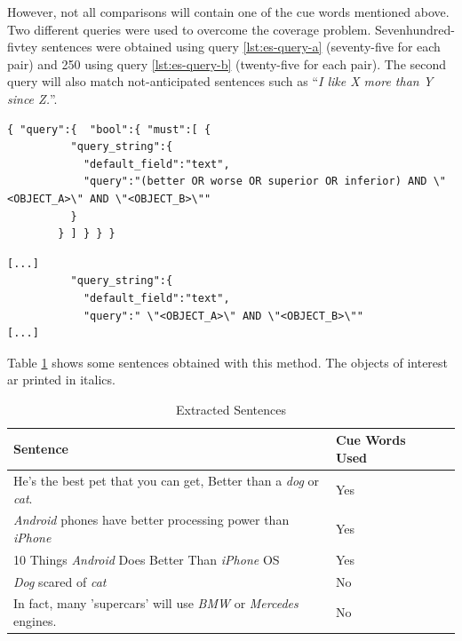 However, not all comparisons will contain one of the cue words mentioned above. Two different queries were used to overcome the coverage problem. Sevenhundred-fivtey sentences were obtained using query \ref{lst:es-query-a} (seventy-five for each pair) and 250 using query \ref{lst:es-query-b} (twenty-five for each pair). The second query will also match not-anticipated sentences such as \enquote{\emph{I like X more than Y since Z.}}.



\begin{lstlisting}[label=lst:es-query-a,breaklines=true,postbreak=\mbox{\textcolor{red}{$\hookrightarrow$}\space},caption=Prestudy Sentence Selection Query A]
{ "query":{  "bool":{ "must":[ {
          "query_string":{
            "default_field":"text",
            "query":"(better OR worse OR superior OR inferior) AND \"<OBJECT_A>\" AND \"<OBJECT_B>\""
          }
        } ] } } }
\end{lstlisting}

\begin{lstlisting}[label=lst:es-query-b,breaklines=true,postbreak=\mbox{\textcolor{red}{$\hookrightarrow$}\space},caption=Prestudy Sentence Selection Query B (shortened)]
[...]
          "query_string":{
            "default_field":"text",
            "query":" \"<OBJECT_A>\" AND \"<OBJECT_B>\""
[...]
\end{lstlisting}

Table \ref{tbl:example_sentences} shows some sentences obtained with this method. The objects of interest ar printed in italics.

\begin{table}[h]
\centering
\caption{Extracted Sentences}
\label{tbl:example_sentences}
\begin{tabular}{@{}llr@{}}
\toprule
 Sentence   &  Cue Words Used                      \\ \midrule
 He's the best pet that you can get, Better than a \emph{dog} or \emph{cat}. & Yes \\
\emph{Android} phones have better processing power than \emph{iPhone} & Yes \\
 10 Things \emph{Android} Does Better Than \emph{iPhone} OS & Yes \\
 \emph{Dog} scared of \emph{cat} & No \\
 In fact, many 'supercars' will use \emph{BMW} or \emph{Mercedes} engines. & No \\

\bottomrule  
                               
\end{tabular}
\end{table}



